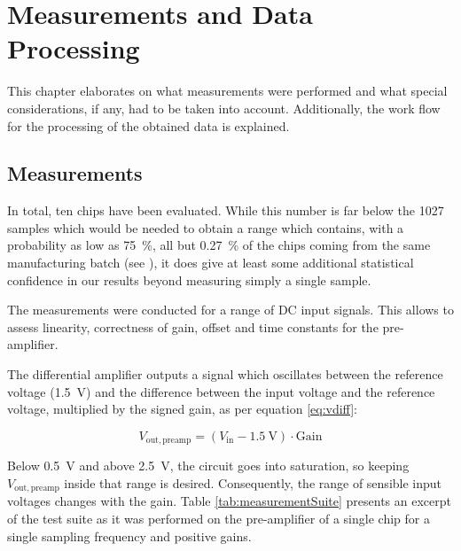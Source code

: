 \chapter{Measurements and Data Processing}
\label{chap:measurementProcess}


This chapter elaborates  on what measurements were performed  and what special
considerations, if any,  had to be taken into  account. Additionally, the work
flow for the processing of the obtained data is explained.


\section{Measurements}
\label{sec:measurements}

In total,  ten chips have been  evaluated. While this number is  far below the
\num{1027} samples  which would be  needed to  obtain a range  which contains,
with a probability as low as \SI{75}{\percent}, all but \SI{0.27}{\percent} of
the chips coming from the same manufacturing batch (see \cite{ref:3sfall}), it
does  give at  least some  additional  statistical confidence  in our  results
beyond measuring simply a single sample.

The  measurements  were conducted for a range of DC input signals. This allows
to assess linearity, correctness of gain, offset and  time  constants  for the
pre-amplifier.

The  differential amplifier  outputs  a signal  which  oscillates between  the
reference  voltage  (\SI{1.5}{\volt}) and  the  difference  between the  input
voltage  and the  reference voltage,  multiplied by  the signed  gain, as  per
equation \ref{eq:vdiff}:

\begin{equation}
    \label{eq:vdiff}
    V_{\mathrm{out, preamp}} = ( V_{\mathrm{in}} - \SI{1.5}{\volt} ) \cdot \mathrm{Gain}
\end{equation}

Below  \SI{0.5}{\volt}  and  above  \SI{2.5}{\volt},  the  circuit  goes  into
saturation,  so  keeping  $V_{\mathrm{out,  preamp}}$  inside  that  range  is
desired. Consequently, the range  of sensible input voltages  changes with the
gain. Table \ref{tab:measurementSuite}  presents an excerpt of  the test suite
as  it was  performed on  the  pre-amplifier of  a  single chip  for a  single
sampling frequency and positive gains.

